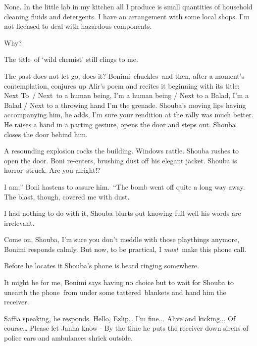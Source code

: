\documentclass[twoside,11pt]{book}
\begin{document}
{\textquotedbl}None. In the little lab in my kitchen all I produce is small quantities of household cleaning fluids and
detergents. I have an arrangement with some local shops. I'm not licensed to deal with hazardous
components.{\textquotedbl} 

{\textquotedbl}Why?{\textquotedbl}

{\textquotedbl}The title~of {}`wild chemist' still clings to me.{\textquotedbl} 

{\textquotedbl}The past does not let go, does it?{\textquotedbl} Bonimi~chuckles\ and then, after a moment's
contemplation, conjures up Alir's poem and recites it beginning with its title: {\textquotedbl}Next To\ / Next~to a
human being, I'm a human being / Next to a Balad, I'm a Balad / Next to a throwing hand I'm the grenade.{\textquotedbl}
Shouba's moving lips having accompanying him, he adds, {\textquotedbl}I'm sure your rendition at the rally was much
better.{\textquotedbl} He raises a hand in a parting gesture, opens the door and steps out. Shouba closes the door
behind him.

A resounding explosion rocks the building. Windows rattle. Shouba rushes to open the door. Boni re-enters, brushing dust
off his elegant jacket. Shouba is horror\ struck. {\textquotedbl}Are you alright!?{\textquotedbl} 

{\textquotedbl}I am,'' Boni hastens to assure him.\ {}``The bomb went off quite a long way away. The blast, though,
covered me with dust.{\textquotedbl} 

{\textquotedbl}I had nothing to do with it,{\textquotedbl} Shouba blurts out knowing full well his words are irrelevant.

{\textquotedbl}Come on, Shouba, I'm sure you don't meddle with those playthings anymore,{\textquotedbl} Bonimi responds
calmly.  {\textquotedbl}But now, to be practical, I \textit{must\ }make this phone call.{\textquotedbl}

 Before he locates it Shouba's phone is heard ringing somewhere. 

{\textquotedbl}It might be for me,{\textquotedbl} Bonimi says having no choice but to wait for Shouba to unearth the
phone~from under some tattered{\ }blankets and hand him the receiver. 

{\textquotedbl}Saffia speaking,{\textquotedbl} he responds. {\textquotedbl}Hello, Ezlip{\dots} I'm fine... Alive and
kicking... Of course{\dots} Please let Janha know -{\textquotedbl} By the time he puts the receiver down sirens of
police cars and ambulances shriek outside. 
\end{document}
